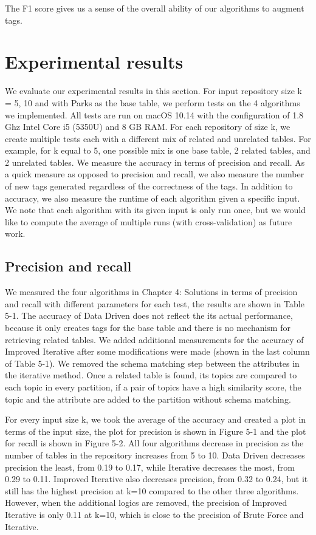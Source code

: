 The F1 score gives us a sense of the overall ability of our algorithms to augment tags.

\section{Experimental results}
\label{sec:ExperimentalResults}

We evaluate our experimental results in this section. For input repository size k = 5, 10 and with Parks as the base table, we perform tests on the 4 algorithms we implemented. All tests are run on macOS 10.14 with the configuration of 1.8 Ghz Intel Core i5 (5350U) and 8 GB RAM. For each repository of size k, we create multiple tests each with a different mix of related and unrelated tables. For example, for k equal to 5, one possible mix is one base table, 2 related tables, and 2 unrelated tables. We measure the accuracy in terms of precision and recall. As a quick measure as opposed to precision and recall, we also measure the number of new tags generated regardless of the correctness of the tags. In addition to accuracy, we also measure the runtime of each algorithm given a specific input. We note that each algorithm with its given input is only run once, but we would like to compute the average of multiple runs (with cross-validation) as future work.

\subsection{Precision and recall}

We measured the four algorithms in Chapter 4: Solutions in terms of precision and recall with different parameters for each test, the results are shown in Table 5-1. The accuracy of Data Driven does not reflect the its actual performance, because it only creates tags for the base table and there is no mechanism for retrieving related tables. We added additional measurements for the accuracy of Improved Iterative after some modifications were made (shown in the last column of Table 5-1). We removed the schema matching step between the attributes in the iterative method. Once a related table is found, its topics are compared to each topic in every partition, if a pair of topics have a high similarity score, the topic and the attribute are added to the partition without schema matching.

For every input size k, we took the average of the accuracy and created a plot in terms of the input size, the plot for precision is shown in Figure 5-1 and the plot for recall is shown in Figure 5-2. All four algorithms decrease in precision as the number of tables in the repository increases from 5 to 10. Data Driven decreases precision the least, from 0.19 to 0.17, while Iterative decreases the most, from 0.29 to 0.11. Improved Iterative also decreases precision, from 0.32 to 0.24, but it still has the highest precision at k=10 compared to the other three algorithms. However, when the additional logics are removed, the precision of Improved Iterative is only 0.11 at k=10, which is close to the precision of Brute Force and Iterative.

